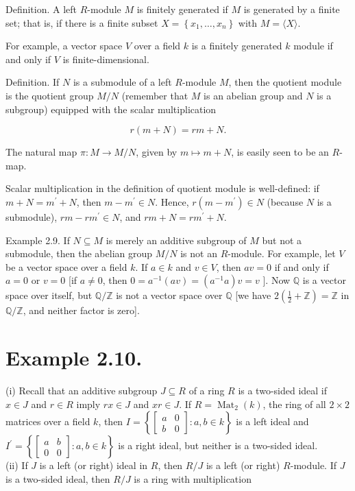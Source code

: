 \documentclass[10pt]{article}
\begin{document}
Definition. A left $R$-module $M$ is finitely generated if $M$ is generated by a finite set; that is, if there is a finite subset $X=\left\{x_{1}, \ldots, x_{n}\right\}$ with $M=\langle X\rangle$.

For example, a vector space $V$ over a field $k$ is a finitely generated $k$ module if and only if $V$ is finite-dimensional.

Definition. If $N$ is a submodule of a left $R$-module $M$, then the quotient module is the quotient group $M / N$ (remember that $M$ is an abelian group and $N$ is a subgroup) equipped with the scalar multiplication

$$
r(m+N)=r m+N .
$$

The natural map $\pi: M \rightarrow M / N$, given by $m \mapsto m+N$, is easily seen to be an $R$-map.

Scalar multiplication in the definition of quotient module is well-defined: if $m+N=m^{\prime}+N$, then $m-m^{\prime} \in N$. Hence, $r\left(m-m^{\prime}\right) \in N$ (because $N$ is a submodule), $r m-r m^{\prime} \in N$, and $r m+N=r m^{\prime}+N$.

Example 2.9. If $N \subseteq M$ is merely an additive subgroup of $M$ but not a submodule, then the abelian group $M / N$ is not an $R$-module. For example, let $V$ be a vector space over a field $k$. If $a \in k$ and $v \in V$, then $a v=0$ if and only if $a=0$ or $v=0$ [if $a \neq 0$, then $0=a^{-1}(a v)=\left(a^{-1} a\right) v=v$ ]. Now $\mathbb{Q}$ is a vector space over itself, but $\mathbb{Q} / \mathbb{Z}$ is not a vector space over $\mathbb{Q}$ [we have $2\left(\frac{1}{2}+\mathbb{Z}\right)=\mathbb{Z}$ in $\mathbb{Q} / \mathbb{Z}$, and neither factor is zero].

\section*{Example 2.10.}
(i) Recall that an additive subgroup $J \subseteq R$ of a ring $R$ is a two-sided ideal if $x \in J$ and $r \in R$ imply $r x \in J$ and $x r \in J$. If $R=\operatorname{Mat}_{2}(k)$, the ring of all $2 \times 2$ matrices over a field $k$, then $I=\left\{\left[\begin{array}{cc}a & 0 \\ b & 0\end{array}\right]: a, b \in k\right\}$ is a left ideal and $I^{\prime}=\left\{\left[\begin{array}{cc}a & b \\ 0 & 0\end{array}\right]: a, b \in k\right\}$ is a right ideal, but neither is a two-sided ideal.\\
(ii) If $J$ is a left (or right) ideal in $R$, then $R / J$ is a left (or right) $R$-module. If $J$ is a two-sided ideal, then $R / J$ is a ring with multiplication
\end{document}
